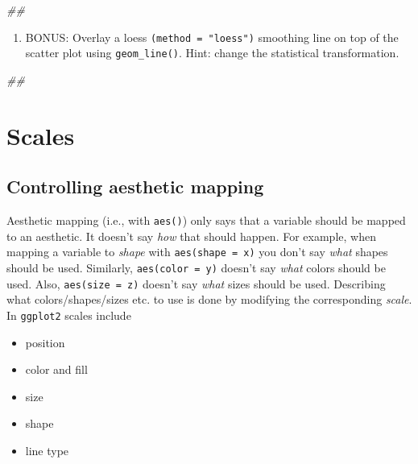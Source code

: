 \documentclass[]{book}
\newenvironment{Shaded}{\begin{snugshade}}{\end{snugshade}}
\newcommand{\CommentTok}[1]{\textcolor[rgb]{0.56,0.35,0.01}{\textit{#1}}}
\providecommand{\tightlist}{%
  \setlength{\itemsep}{0pt}\setlength{\parskip}{0pt}}
\begin{document}
\begin{Shaded}
\begin{Highlighting}[]
\CommentTok{## }
\end{Highlighting}
\end{Shaded}

\begin{enumerate}
\def\labelenumi{\arabic{enumi}.}
\setcounter{enumi}{4}
\tightlist
\item
  BONUS: Overlay a loess \texttt{(method\ =\ "loess")} smoothing line on top of the scatter plot using \texttt{geom\_line()}. Hint: change the statistical transformation.
\end{enumerate}

\begin{Shaded}
\begin{Highlighting}[]
\CommentTok{## }
\end{Highlighting}
\end{Shaded}

\hypertarget{scales}{%
\section{Scales}\label{scales}}

\hypertarget{controlling-aesthetic-mapping}{%
\subsection{Controlling aesthetic mapping}\label{controlling-aesthetic-mapping}}

Aesthetic mapping (i.e., with \texttt{aes()}) only says that a variable should be mapped to an aesthetic. It doesn't say \emph{how} that should happen. For example, when mapping a variable to \emph{shape} with \texttt{aes(shape\ =\ x)} you don't say \emph{what} shapes should be used. Similarly, \texttt{aes(color\ =\ y)} doesn't say \emph{what} colors should be used. Also, \texttt{aes(size\ =\ z)} doesn't say \emph{what} sizes should be used. Describing what colors/shapes/sizes etc. to use is done by modifying the corresponding \emph{scale}. In \texttt{ggplot2} scales include

\begin{itemize}
\tightlist
\item
  position
\item
  color and fill
\item
  size
\item
  shape
\item
  line type
\end{itemize}
\end{document}
